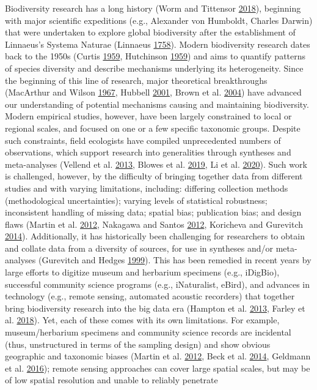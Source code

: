 \documentclass[
  12pt,
]{article}
\begin{document}
Biodiversity research has a long history (Worm and Tittensor \protect\hyperlink{ref-worm2018theory}{2018}), beginning with major scientific expeditions (e.g., Alexander von Humboldt, Charles Darwin) that were undertaken to explore global biodiversity after the establishment of Linnaeus's Systema Naturae (Linnaeus \protect\hyperlink{ref-linnaeus1758systema}{1758}). Modern biodiversity research dates back to the 1950s (Curtis \protect\hyperlink{ref-curtis1959vegetation}{1959}, Hutchinson \protect\hyperlink{ref-hutchinson1959homage}{1959}) and aims to quantify patterns of species diversity and describe mechanisms underlying its heterogeneity. Since the beginning of this line of research, major theoretical breakthroughs (MacArthur and Wilson \protect\hyperlink{ref-macarthur1967theory}{1967}, Hubbell \protect\hyperlink{ref-hubbell2001unified}{2001}, Brown et al. \protect\hyperlink{ref-brown2004toward}{2004}) have advanced our understanding of potential mechanisms causing and maintaining biodiversity. Modern empirical studies, however, have been largely constrained to local or regional scales, and focused on one or a few specific taxonomic groups. Despite such constraints, field ecologists have compiled unprecedented numbers of observations, which support research into generalities through syntheses and meta-analyses (Vellend et al. \protect\hyperlink{ref-vellend2013global}{2013}, Blowes et al. \protect\hyperlink{ref-blowes2019geography}{2019}, Li et al. \protect\hyperlink{ref-li2020changes}{2020}). Such work is challenged, however, by the difficulty of bringing together data from different studies and with varying limitations, including: differing collection methods (methodological uncertainties); varying levels of statistical robustness; inconsistent handling of missing data; spatial bias; publication bias; and design flaws (Martin et al. \protect\hyperlink{ref-martin2012mapping}{2012}, Nakagawa and Santos \protect\hyperlink{ref-nakagawa2012methodological}{2012}, Koricheva and Gurevitch \protect\hyperlink{ref-koricheva2014uses}{2014}). Additionally, it has historically been challenging for researchers to obtain and collate data from a diversity of sources, for use in syntheses and/or meta-analyses (Gurevitch and Hedges \protect\hyperlink{ref-gurevitch1999statistical}{1999}). This has been remedied in recent years by large efforts to digitize museum and herbarium specimens (e.g., iDigBio), successful community science programs (e.g., iNaturalist, eBird), and advances in technology (e.g., remote sensing, automated acoustic recorders) that together bring biodiversity research into the big data era (Hampton et al. \protect\hyperlink{ref-hampton2013big}{2013}, Farley et al. \protect\hyperlink{ref-farley2018situating}{2018}). Yet, each of these comes with its own limitations. For example, museum/herbarium specimens and community science records are incidental (thus, unstructured in terms of the sampling design) and show obvious geographic and taxonomic biases (Martin et al. \protect\hyperlink{ref-martin2012mapping}{2012}, Beck et al. \protect\hyperlink{ref-beck2014spatial}{2014}, Geldmann et al. \protect\hyperlink{ref-geldmann2016determines}{2016}); remote sensing approaches can cover large spatial scales, but may be of low spatial resolution and unable to reliably penetrate 
\end{document}
